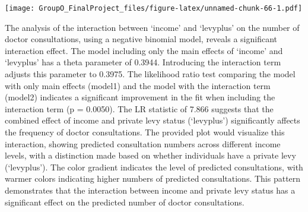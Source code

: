 \documentclass[
]{article}
\newenvironment{Shaded}{\begin{snugshade}}{\end{snugshade}}
\newcommand{\AttributeTok}[1]{\textcolor[rgb]{0.13,0.29,0.53}{#1}}
\newcommand{\CommentTok}[1]{\textcolor[rgb]{0.56,0.35,0.01}{\textit{#1}}}
\newcommand{\FunctionTok}[1]{\textcolor[rgb]{0.13,0.29,0.53}{\textbf{#1}}}
\newcommand{\NormalTok}[1]{#1}
\newcommand{\OtherTok}[1]{\textcolor[rgb]{0.56,0.35,0.01}{#1}}
\newcommand{\SpecialCharTok}[1]{\textcolor[rgb]{0.81,0.36,0.00}{\textbf{#1}}}
\newcommand{\StringTok}[1]{\textcolor[rgb]{0.31,0.60,0.02}{#1}}
\begin{document}
\begin{Shaded}
\end{Shaded}

\texttt{[image: GroupO\_FinalProject\_files/figure-latex/unnamed-chunk-66-1.pdf]}

The analysis of the interaction between `income' and `levyplus' on the
number of doctor consultations, using a negative binomial model, reveals
a significant interaction effect. The model including only the main
effects of `income' and `levyplus' has a theta parameter of 0.3944.
Introducing the interaction term adjusts this parameter to 0.3975. The
likelihood ratio test comparing the model with only main effects
(model1) and the model with the interaction term (model2) indicates a
significant improvement in the fit when including the interaction term
(p = 0.0050). The LR statistic of 7.866 suggests that the combined
effect of income and private levy status (`levyplus') significantly
affects the frequency of doctor consultations. The provided plot would
visualize this interaction, showing predicted consultation numbers
across different income levels, with a distinction made based on whether
individuals have a private levy (`levyplus'). The color gradient
indicates the level of predicted consultations, with warmer colors
indicating higher numbers of predicted consultations. This pattern
demonstrates that the interaction between income and private levy status
has a significant effect on the predicted number of doctor
consultations.
\end{document}
